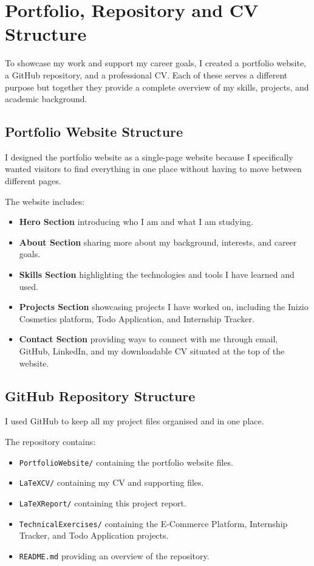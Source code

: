 \documentclass[12pt,a4paper]{article}
\begin{document}
\section{Portfolio, Repository and CV Structure}

To showcase my work and support my career goals, I created a portfolio website, a GitHub repository, and a professional CV. Each of these serves a different purpose but together they provide a complete overview of my skills, projects, and academic background.

\subsection{Portfolio Website Structure}

I designed the portfolio website as a single-page website because I specifically wanted visitors to find everything in one place without having to move between different pages.

The website includes:

\begin{itemize}
\item \textbf{Hero Section} introducing who I am and what I am studying.
\item \textbf{About Section} sharing more about my background, interests, and career goals.
\item \textbf{Skills Section} highlighting the technologies and tools I have learned and used.
\item \textbf{Projects Section} showcasing projects I have worked on, including the Inizio Cosmetics platform, Todo Application, and Internship Tracker.
\item \textbf{Contact Section} providing ways to connect with me through email, GitHub, LinkedIn, and my downloadable CV situated at the top of the website.
\end{itemize}

\subsection{GitHub Repository Structure}

I used GitHub to keep all my project files organised and in one place.

The repository contains:

\begin{itemize}
\item \texttt{PortfolioWebsite/} containing the portfolio website files.
\item \texttt{LaTeXCV/} containing my CV and supporting files.
\item \texttt{LaTeXReport/} containing this project report.
\item \texttt{TechnicalExercises/} containing the E-Commerce Platform, Internship Tracker, and Todo Application projects.
\item \texttt{README.md} providing an overview of the repository.
\end{itemize}
\end{document}
